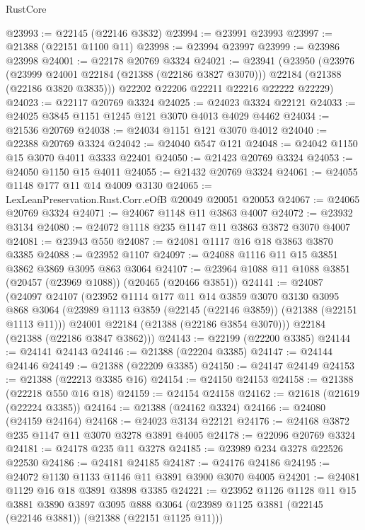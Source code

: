 \begin{lexlean}{RustCore}
\begin{coremodule}
@23993 := @22145 (@22146 @3832)
@23994 := @23991 @23993
@23997 := @21388 (@22151 @1100 @11)
@23998 := @23994 @23997
@23999 := @23986 @23998
@24001 := @22178 @20769 @3324
@24021 := @23941
    (@23950
      (@23976
        (@23999 @24001 @22184 (@21388 (@22186 @3827 @3070)))
        @22184
        (@21388 (@22186 @3820 @3835)))
      @22202
      @22206
      @22211
      @22216
      @22222
      @22229)
@24023 := @22117 @20769 @3324
@24025 := @24023 @3324 @22121
@24033 := @24025 @3845 @1151 @1245 @121 @3070 @4013 @4029 @4462
@24034 := @21536 @20769
@24038 := @24034 @1151 @121 @3070 @4012
@24040 := @22388 @20769 @3324
@24042 := @24040 @547 @121
@24048 := @24042 @1150 @15 @3070 @4011 @3333 @22401
@24050 := @21423 @20769 @3324
@24053 := @24050 @1150 @15 @4011
@24055 := @21432 @20769 @3324
@24061 := @24055 @1148 @177 @11 @14 @4009 @3130
@24065 := LexLeanPreservation.Rust.Corr.eOfB @20049 @20051 @20053
@24067 := @24065 @20769 @3324
@24071 := @24067 @1148 @11 @3863 @4007
@24072 := @23932 @3134
@24080 := @24072 @1118 @235 @1147 @11 @3863 @3872 @3070 @4007
@24081 := @23943 @550
@24087 := @24081 @1117 @16 @18 @3863 @3870 @3385
@24088 := @23952 @1107
@24097 := @24088 @1116 @11 @15 @3851 @3862 @3869 @3095 @863 @3064
@24107 := @23964 @1088 @11 @1088 @3851 (@20457 (@23969 @1088)) (@20465 (@20466 @3851))
@24141 := @24087
    (@24097
      @24107
      (@23952
        @1114
        @177
        @11
        @14
        @3859
        @3070
        @3130
        @3095
        @868
        @3064
        (@23989 @1113 @3859 (@22145 (@22146 @3859)) (@21388 (@22151 @1113 @11)))
        @24001
        @22184
        (@21388 (@22186 @3854 @3070)))
      @22184
      (@21388 (@22186 @3847 @3862)))
@24143 := @22199 (@22200 @3385)
@24144 := @24141 @24143
@24146 := @21388 (@22204 @3385)
@24147 := @24144 @24146
@24149 := @21388 (@22209 @3385)
@24150 := @24147 @24149
@24153 := @21388 (@22213 @3385 @16)
@24154 := @24150 @24153
@24158 := @21388 (@22218 @550 @16 @18)
@24159 := @24154 @24158
@24162 := @21618 (@21619 (@22224 @3385))
@24164 := @21388 (@24162 @3324)
@24166 := @24080 (@24159 @24164)
@24168 := @24023 @3134 @22121
@24176 := @24168 @3872 @235 @1147 @11 @3070 @3278 @3891 @4005
@24178 := @22096 @20769 @3324
@24181 := @24178 @235 @11 @3278
@24185 := @23989 @234 @3278 @22526 @22530
@24186 := @24181 @24185
@24187 := @24176 @24186
@24195 := @24072 @1130 @1133 @1146 @11 @3891 @3900 @3070 @4005
@24201 := @24081 @1129 @16 @18 @3891 @3898 @3385
@24221 := @23952
    @1126
    @1128
    @11
    @15
    @3881
    @3890
    @3897
    @3095
    @888
    @3064
    (@23989 @1125 @3881 (@22145 (@22146 @3881)) (@21388 (@22151 @1125 @11)))

\end{coremodule}
\end{lexlean}
